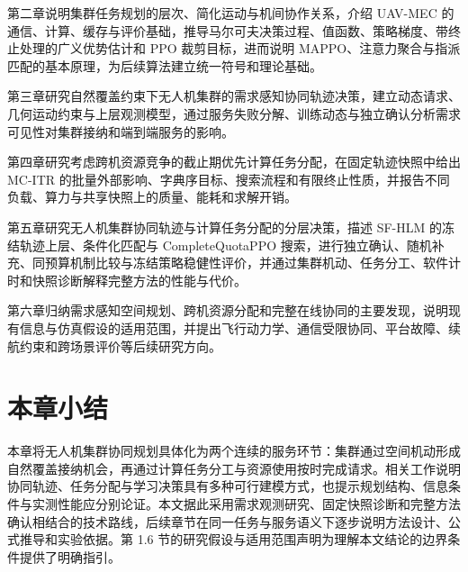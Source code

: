 第二章说明集群任务规划的层次、简化运动与机间协作关系，介绍 UAV-MEC 的通信、计算、缓存与评价基础，推导马尔可夫决策过程、值函数、策略梯度、带终止处理的广义优势估计和 PPO 裁剪目标，进而说明 MAPPO、注意力聚合与指派匹配的基本原理，为后续算法建立统一符号和理论基础。

第三章研究自然覆盖约束下无人机集群的需求感知协同轨迹决策，建立动态请求、几何运动约束与上层观测模型，通过服务失败分解、训练动态与独立确认分析需求可见性对集群接纳和端到端服务的影响。

第四章研究考虑跨机资源竞争的截止期优先计算任务分配，在固定轨迹快照中给出 MC-ITR 的批量外部影响、字典序目标、搜索流程和有限终止性质，并报告不同负载、算力与共享快照上的质量、能耗和求解开销。

第五章研究无人机集群协同轨迹与计算任务分配的分层决策，描述 SF-HLM 的冻结轨迹上层、条件化匹配与 CompleteQuotaPPO 搜索，进行独立确认、随机补充、同预算机制比较与冻结策略稳健性评价，并通过集群机动、任务分工、软件计时和快照诊断解释完整方法的性能与代价。

第六章归纳需求感知空间规划、跨机资源分配和完整在线协同的主要发现，说明现有信息与仿真假设的适用范围，并提出飞行动力学、通信受限协同、平台故障、续航约束和跨场景评价等后续研究方向。



\section{本章小结}
\label{sec:summary-chap01}

本章将无人机集群协同规划具体化为两个连续的服务环节：集群通过空间机动形成自然覆盖接纳机会，再通过计算任务分工与资源使用按时完成请求。相关工作说明协同轨迹、任务分配与学习决策具有多种可行建模方式，也提示规划结构、信息条件与实测性能应分别论证。本文据此采用需求观测研究、固定快照诊断和完整方法确认相结合的技术路线，后续章节在同一任务与服务语义下逐步说明方法设计、公式推导和实验依据。第 1.6 节的研究假设与适用范围声明为理解本文结论的边界条件提供了明确指引。
